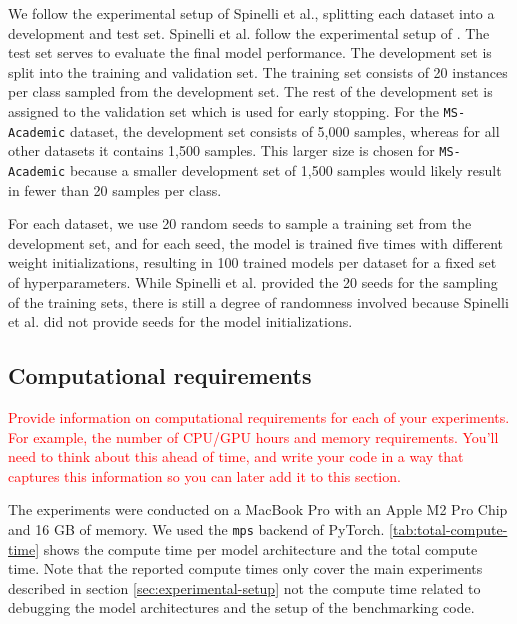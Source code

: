 \documentclass{gdl}
\begin{document}
We follow the experimental setup of Spinelli et al., splitting each dataset into a development and test set. Spinelli et al. follow the experimental setup of \cite{Klicpera2019}. The test set serves to evaluate the final model performance. The development set is split into the training and validation set. The training set consists of 20 instances per class sampled from the development set. The rest of the development set is assigned to the validation set which is used for early stopping. For the \texttt{MS-Academic} dataset, the development set consists of 5,000 samples, whereas for all other datasets it contains 1,500 samples. This larger size is chosen for \texttt{MS-Academic} because a smaller development set of 1,500 samples would likely result in fewer than 20 samples per class. 

For each dataset, we use 20 random seeds to sample a training set from the development set, and for each seed, the model is trained five times with different weight initializations, resulting in 100 trained models per dataset for a fixed set of hyperparameters. While Spinelli et al. provided the 20 seeds for the sampling of the training sets, there is still a degree of randomness involved because Spinelli et al. did not provide seeds for the model initializations.

\subsection{Computational requirements}
\textcolor{red}{Provide information on computational requirements for each of your experiments. For example, the number of CPU/GPU hours and memory requirements. You'll need to think about this ahead of time, and write your code in a way that captures this information so you can later add it to this section. }

The experiments were conducted on a MacBook Pro with an Apple M2 Pro Chip and 16 GB of memory. We used the \texttt{mps} backend of PyTorch. \autoref{tab:total-compute-time} shows the compute time per model architecture and the total compute time. Note that the reported compute times only cover the main experiments described in section \ref{sec:experimental-setup} not the compute time related to debugging the model architectures and the setup of the benchmarking code.
\end{document}

